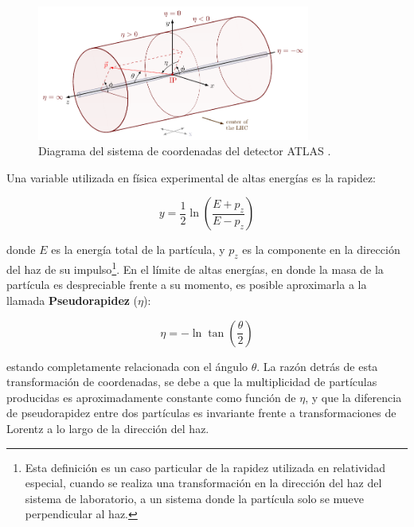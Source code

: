 \begin{figure}
\centering
  \includegraphics[width=0.8\textwidth]{images/lhc/atlas_coordinates2.pdf}
  \caption{Diagrama del sistema de coordenadas del detector ATLAS \cite{atlas_coordinates}.}
  \label{fig:atlas_coordinates}
\end{figure}


Una variable utilizada en física experimental de altas energías es la rapidez:

\begin{equation}
y=\frac{1}{2}\ln\left( \frac{E+p_{z}}{E-p_{z}}\right)
\end{equation}

\noindent
donde $E$ es la energía total de la partícula, y $p_{z}$ es la componente en la dirección del haz de su impulso\footnote{Esta definición es un caso particular de la rapidez utilizada en relatividad especial, cuando se realiza una transformación en la dirección del haz del sistema de laboratorio, a un sistema donde la partícula solo se mueve perpendicular al haz.}. En el límite de altas energías, en donde la masa de la partícula es despreciable frente a su momento, es posible aproximarla a la llamada \textbf{Pseudorapidez} ($\eta$):

\begin{equation}
\eta =-\ln \tan\left( \frac{\theta}{2} \right)
\end{equation}

\noindent
estando completamente relacionada con el ángulo $\theta$. La razón detrás de esta transformación de coordenadas, se debe a que
 la multiplicidad de partículas producidas es aproximadamente constante como función de $\eta$, y que 
 la diferencia de pseudorapidez entre dos partículas es invariante frente a transformaciones de Lorentz a lo largo de la dirección del haz. 

